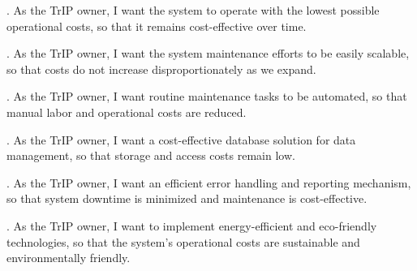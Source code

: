 . As the TrIP owner, I want the system to operate with the lowest possible operational costs, so that it remains cost-effective over time.

. As the TrIP owner, I want the system maintenance efforts to be easily scalable, so that costs do not increase disproportionately as we expand.

. As the TrIP owner, I want routine maintenance tasks to be automated, so that manual labor and operational costs are reduced.

. As the TrIP owner, I want a cost-effective database solution for data management, so that storage and access costs remain low.

. As the TrIP owner, I want an efficient error handling and reporting mechanism, so that system downtime is minimized and maintenance is cost-effective.

. As the TrIP owner, I want to implement energy-efficient and eco-friendly technologies, so that the system's operational costs are sustainable and environmentally friendly.


